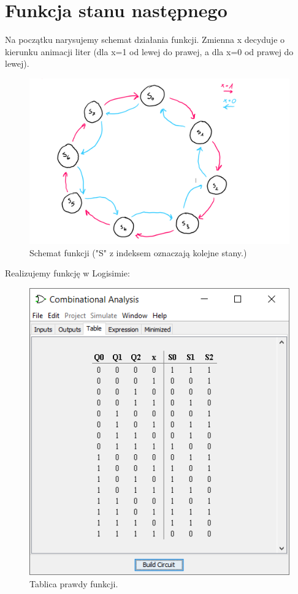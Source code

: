 \documentclass[]{article}
\begin{document}
\section{Funkcja stanu następnego}
Na początku narysujemy schemat działania funkcji. Zmienna x decyduje o kierunku animacji liter (dla x=1 od lewej do prawej, a dla x=0 od prawej do lewej).
\begin{figure}[H]
	\centering
	\includegraphics[width=1\textwidth]{szkic.png}
	\caption{Schemat funkcji ("S" z indeksem oznaczają kolejne stany.)}
\end{figure}
Realizujemy funkcję w Logisimie:
\begin{figure}[H]
	\centering
	\includegraphics[width=1\textwidth]{tablicaprawdy.png}
	\caption{Tablica prawdy funkcji.}
\end{figure}
\end{document}

